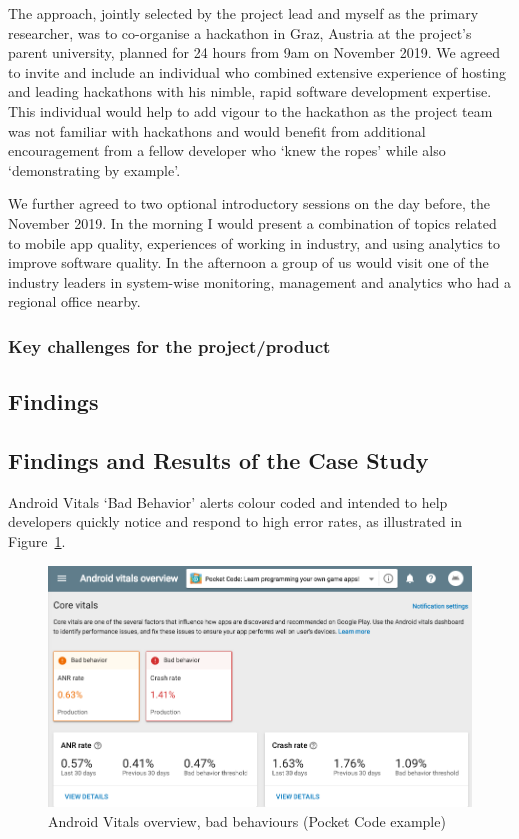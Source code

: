 The approach, jointly selected by the project lead %
and myself as the primary researcher,
was to co-organise a hackathon in Graz, Austria at the project's parent university, planned for 24 hours from 9am on  November 2019. We agreed to invite and include an individual who combined extensive experience of hosting and leading hackathons with his nimble, rapid software development expertise. This individual would help to add vigour to the hackathon as the project team was not familiar with hackathons and would benefit from additional encouragement from a fellow developer who `knew the ropes' while also `demonstrating by example'.

We further agreed to two optional introductory sessions on the day before, the~ November 2019. In the morning I would present a combination of topics related to mobile app quality, experiences of working in industry, and using analytics to improve software quality. In the afternoon a group of us would visit one of the industry leaders in system-wise monitoring, management and analytics who had a regional office nearby.

\subsubsection{Key challenges for the project/product}

\subsection{Findings}
\subsection{Findings and Results of the Case Study}
\label{catrobat-case-study-findings-and-results}

Android Vitals `Bad Behavior' alerts colour coded and intended to help developers quickly notice and respond to high error rates, as illustrated in Figure~\ref{fig:android-vitals-pocketcode-alerts-23-jan-2020}. %

\begin{figure}
    \centering
    \includegraphics[width=12cm]{images/google-play-console/android-vitals-pocketcode-alerts-23-jan-2020.png}
    \caption{Android Vitals overview, bad behaviours (Pocket Code example)}
    \label{fig:android-vitals-pocketcode-alerts-23-jan-2020}
\end{figure}

